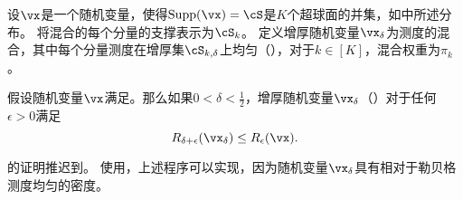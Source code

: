 \documentclass[../../book-main.tex]{subfiles}
\begin{document}
\begin{definition}\label{def:thickening-rv-uos}
    设$\vx$是一个随机变量，使得$\Supp(\vx) = \cS$是$K$个超球面的并集，如中所述分布。
    将混合的每个分量的支撑表示为$\cS_k$。
    定义增厚随机变量$\vx_{\delta}$为测度的混合，其中每个分量测度在增厚集$\cS_{k, \delta}$上均匀（），对于$k \in [K]$，混合权重为$\pi_k$。
\end{definition}


\begin{lemma}\label{lem:rate-distortion-lb-uos}
    假设随机变量$\vx$满足。那么如果$0 < \delta < \tfrac{1}{2}$，增厚随机变量$\vx_{\delta}$（）对于任何$\epsilon > 0$满足
    \begin{equation}
        R_{\delta + \epsilon}(\vx_{\delta})
        \leq
        R_{\epsilon}(\vx).
    \end{equation}
\end{lemma}

的证明推迟到。
使用，上述程序可以实现，因为随机变量$\vx_{\delta}$具有相对于勒贝格测度均匀的密度。
\end{document}
